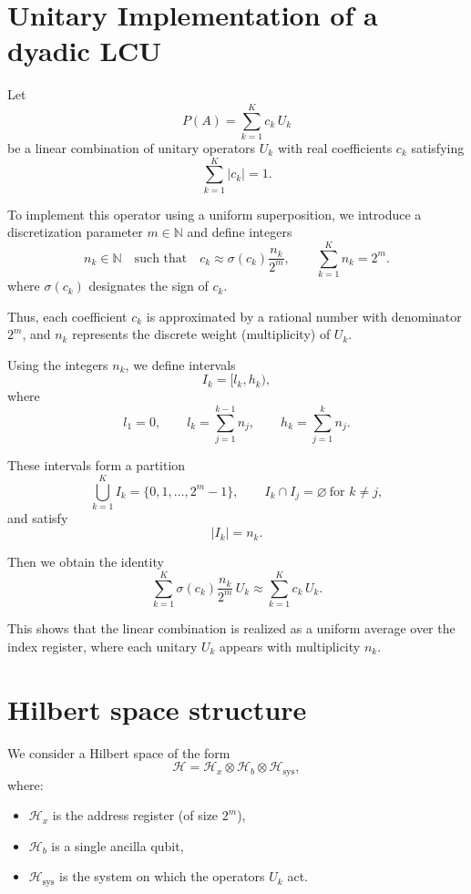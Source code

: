 \documentclass{article}
\begin{document}
\section*{Unitary Implementation of a dyadic LCU}

Let
\[
P(A) = \sum_{k=1}^K c_k\, U_k
\]
be a linear combination of unitary operators $U_k$ with real coefficients $c_k$
satisfying
\[
\sum_{k=1}^K |c_k| = 1.
\]

\medskip

To implement this operator using a uniform superposition, we introduce a
discretization parameter $m \in \mathbb{N}$ and define integers
\[
n_k \in \mathbb{N}
\quad \text{such that} \quad
c_k \approx \sigma(c_k) \frac{n_k}{2^m},
\qquad
\sum_{k=1}^K n_k = 2^m.
\]
where $\sigma(c_k)$ designates the sign of $c_k$.


Thus, each coefficient $c_k$ is approximated by a rational number with denominator $2^m$,
and $n_k$ represents the discrete weight (multiplicity) of $U_k$.

\medskip

Using the integers $n_k$, we define intervals
\[
I_k = [l_k, h_k),
\]
where
\[
l_1 = 0, \qquad
l_k = \sum_{j=1}^{k-1} n_j, \qquad
h_k = \sum_{j=1}^{k} n_j.
\]

These intervals form a partition
\[
\bigcup_{k=1}^K I_k = \{0,1,\dots,2^m - 1\},
\qquad
I_k \cap I_j = \varnothing \ \text{for } k \ne j,
\]
and satisfy
\[
|I_k| = n_k.
\]

\medskip



Then we obtain the identity
\[
\boxed{
\sum_{k=1}^K \sigma(c_k)\frac{n_k}{2^m}\, U_k
\approx
\sum_{k=1}^K c_k\, U_k.
}
\]

\medskip

This shows that the linear combination is realized as a uniform average
over the index register, where each unitary $U_k$ appears with multiplicity $n_k$.


\section*{Hilbert space structure}

We consider a Hilbert space of the form
\[
\mathcal{H}
= \mathcal{H}_x \otimes \mathcal{H}_b \otimes \mathcal{H}_{\mathrm{sys}},
\]
where:
\begin{itemize}
\item $\mathcal{H}_x$ is the address register (of size $2^m$),
\item $\mathcal{H}_b$ is a single ancilla qubit,
\item $\mathcal{H}_{\mathrm{sys}}$ is the system on which the operators $U_k$ act.
\end{itemize}
\end{document}
